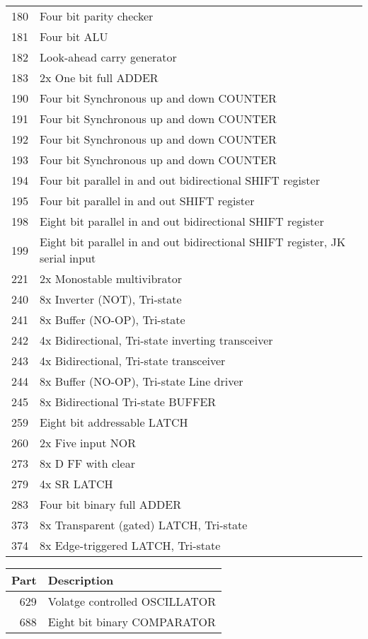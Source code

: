 \begin{tabular}{rl}
180 & Four bit parity checker\\
181 & Four bit ALU\\
182 & Look-ahead carry generator\\
183 & 2x One bit full ADDER\\
190 & Four bit Synchronous up and down COUNTER\\
191 & Four bit Synchronous up and down COUNTER\\
192 & Four bit Synchronous up and down COUNTER\\
193 & Four bit Synchronous up and down COUNTER\\
194 & Four bit parallel in and out bidirectional SHIFT register\\
195 & Four bit parallel in and out SHIFT register\\
198 & Eight bit parallel in and out bidirectional SHIFT register\\
199 & Eight bit parallel in and out bidirectional SHIFT register, JK serial input\\
221 & 2x Monostable multivibrator\\
240 & 8x Inverter (NOT), Tri-state\\
241 & 8x Buffer (NO-OP), Tri-state\\
242 & 4x Bidirectional, Tri-state inverting transceiver\\
243 & 4x Bidirectional, Tri-state transceiver\\
244 & 8x Buffer (NO-OP), Tri-state Line driver\\
245 & 8x Bidirectional Tri-state BUFFER\\
259 & Eight bit addressable LATCH\\
260 & 2x Five input NOR\\
273 & 8x D FF with clear\\
279 & 4x SR LATCH\\
283 & Four bit binary full ADDER\\
373 & 8x Transparent (gated) LATCH, Tri-state\\
374 & 8x Edge-triggered LATCH, Tri-state\\
\end{tabular}

\begin{tabular}{rl}
Part & Description \\\hline
629 & Volatge controlled OSCILLATOR\\
688 & Eight bit binary COMPARATOR\\
\end{tabular}